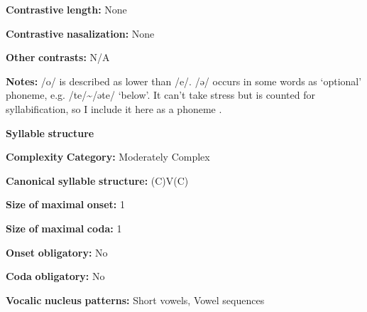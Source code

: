 \begin{styleBody}
\textbf{Contrastive} \textbf{length:} None
\end{styleBody}

\begin{styleBody}
\textbf{Contrastive} \textbf{nasalization:} None
\end{styleBody}

\begin{styleBody}
\textbf{Other} \textbf{contrasts:} N/A
\end{styleBody}

\begin{styleBody}
\textbf{Notes:} /o/ is described as lower than /e/. /ə/ occurs in some words as ‘optional’ phoneme, e.g. /te/{\textasciitilde}/əte/ ‘below’. It can’t take stress but is counted for syllabification, so I include it here as a phoneme \citep[15-18]{Dol2007}.
\end{styleBody}

\begin{styleBody}
\textbf{Syllable} \textbf{structure}
\end{styleBody}

\begin{styleBody}
\textbf{Complexity} \textbf{Category:} Moderately Complex
\end{styleBody}

\begin{styleBody}
\textbf{Canonical} \textbf{syllable} \textbf{structure:} (C)V(C) \citep[34-8]{Dol2007}
\end{styleBody}

\begin{styleBody}
\textbf{Size} \textbf{of} \textbf{maximal} \textbf{onset:} 1
\end{styleBody}

\begin{styleBody}
\textbf{Size} \textbf{of} \textbf{maximal} \textbf{coda:} 1
\end{styleBody}

\begin{styleBody}
\textbf{Onset} \textbf{obligatory:} No
\end{styleBody}

\begin{styleBody}
\textbf{Coda} \textbf{obligatory:} No
\end{styleBody}

\begin{styleBody}
\textbf{Vocalic} \textbf{nucleus} \textbf{patterns:} Short vowels, Vowel sequences
\end{styleBody}


